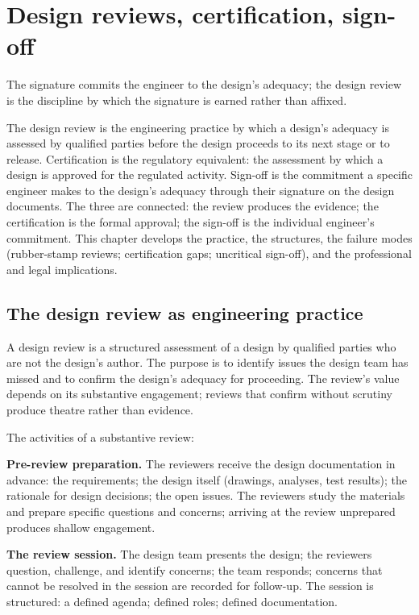 \chapter{Design reviews, certification, sign-off}
\label{vol11:ch09}

\epigraph{The signature commits the engineer to the design's adequacy; the design review is the discipline by which the signature is earned rather than affixed.}{}


\noindent
The design review is the engineering practice by which a design's adequacy is assessed by qualified parties before the design proceeds to its next stage or to release. Certification is the regulatory equivalent: the assessment by which a design is approved for the regulated activity. Sign-off is the commitment a specific engineer makes to the design's adequacy through their signature on the design documents. The three are connected: the review produces the evidence; the certification is the formal approval; the sign-off is the individual engineer's commitment. This chapter develops the practice, the structures, the failure modes (rubber-stamp reviews; certification gaps; uncritical sign-off), and the professional and legal implications.

\section{The design review as engineering practice}

A design review is a structured assessment of a design by qualified parties who are not the design's author. The purpose is to identify issues the design team has missed and to confirm the design's adequacy for proceeding. The review's value depends on its substantive engagement; reviews that confirm without scrutiny produce theatre rather than evidence.

The activities of a substantive review:

\textbf{Pre-review preparation.} The reviewers receive the design documentation in advance: the requirements; the design itself (drawings, analyses, test results); the rationale for design decisions; the open issues. The reviewers study the materials and prepare specific questions and concerns; arriving at the review unprepared produces shallow engagement.

\textbf{The review session.} The design team presents the design; the reviewers question, challenge, and identify concerns; the team responds; concerns that cannot be resolved in the session are recorded for follow-up. The session is structured: a defined agenda; defined roles; defined documentation.


